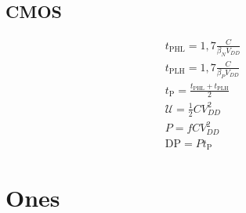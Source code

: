 \documentclass[10pt,twocolumn]{article}
\begin{document}
\subsection{CMOS}
\begin{gather*}
    t_\text{PHL} = 1,7\frac{C}{\beta_N V_{DD}} \\
    t_\text{PLH} = 1,7\frac{C}{\beta_P V_{DD}} \\
    t_\text{P} = \frac{t_\text{PHL} + t_\text{PLH}}{2} \\
    \mathcal{U} = \frac{1}{2} C V_{DD}^2 \\
    P = fCV_{DD}^2 \\
    \text{DP} = Pt_\text{P}
\end{gather*}
\section{Ones}
\end{document}
